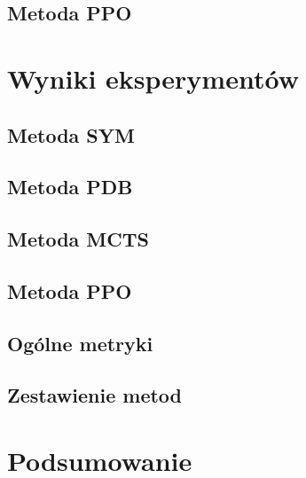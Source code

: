 \documentclass[a4paper,11pt,twoside]{report}
\makeatletter
\def\cleardoublepage{\clearpage\if@twoside
\ifodd\c@page\else\hbox{}\thispagestyle{empty}\newpage
\if@twocolumn\hbox{}\newpage\fi\fi\fi}
\theoremstyle{definition}
\makeatother
\begin{document}
\section{Metoda PPO}

\cleardoublepage

\chapter{Wyniki eksperymentów} \label{chap:work}

\cleardoublepage
\section{Metoda SYM} \label{subs:exp_sym}

\cleardoublepage
\section{Metoda PDB} \label{subs:exp_pdb}

\cleardoublepage
\section{Metoda MCTS}

\cleardoublepage
\section{Metoda PPO} \label{subs:exp_ppo}

\cleardoublepage
\section{Ogólne metryki} \label{subs:metric_auth}

\cleardoublepage
\section{Zestawienie metod}

\cleardoublepage
\chapter{Podsumowanie}

\cleardoublepage
\end{document}
